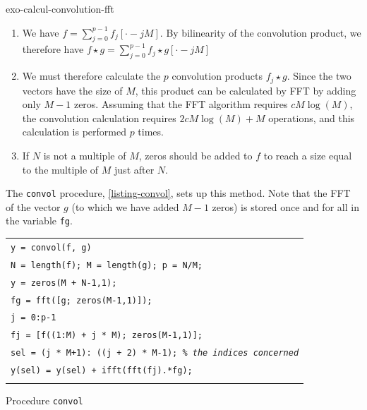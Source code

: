  
\begin{correction}{exo-calcul-convolution-fft}
\begin{enumerate}
\item We have $ f = \sum_{j = 0}^{p-1}{f_j [\cdot-j M]} $. By bilinearity of the convolution product, we therefore have $ f \star g = \sum_{j = 0}^{p-1}{f_j \star g [\cdot-j M]} $
\item We must therefore calculate the $ p $ convolution products $ f_j \star g $. Since the two vectors have the size of $ M $, this product can be calculated by FFT by adding only $ M-1 $ zeros. Assuming that the FFT algorithm requires $ c M \log (M) $, the convolution calculation requires $ 2 c M \log (M) + M $ operations, and this calculation is performed $ p $ times.
\item If $ N $ is not a multiple of $ M $, zeros should be added to $ f $ to reach a size equal to the multiple of $ M $ just after $ N $.
\end{enumerate} The \Matlab{} \texttt{\upshape convol} procedure, \listingterme{} \ref{listing-convol}, sets up this method. Note that the FFT of the vector $ g $ (to which we have added $ M-1 $ zeros) is stored once and for all in the variable \texttt{\upshape fg}.

\begin{listing} \begin{footnotesize}
{\upshape
\begin{tabular}{l} \texttt{\pfunction y = convol(f, g)} \\
\texttt{N = length(f); M = length(g); p = N/M;} \\
\texttt{y = zeros(M + N-1,1);} \\
\texttt{fg = fft([g; zeros(M-1,1)]);} \\
\texttt{\pfor j = 0:p-1} \\
\texttt{\quad fj = [f((1:M) + j * M); zeros(M-1,1)];} \\
\texttt{\quad sel = (j * M+1): ((j + 2) * M-1); \textit{\% the indices concerned}} \\
\texttt{\quad y(sel) = y(sel) + ifft(fft(fj).*fg);} \\
\texttt{\pend} \\
\end{tabular}
}
\end{footnotesize}
\caption{Procedure \texttt{\upshape convol}}
\label{listing-convol}
\end{listing}
\end{correction}
 
